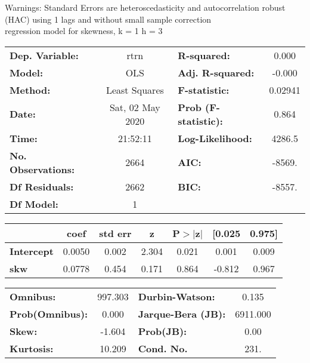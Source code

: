 Warnings: \newline
 [1] Standard Errors are heteroscedasticity and autocorrelation robust (HAC) using 1 lags and without small sample correction\\ 

regression model for skewness, k = 1 h = 3\begin{center}
\begin{tabular}{lclc}
\toprule
\textbf{Dep. Variable:}    &       rtrn       & \textbf{  R-squared:         } &     0.000   \\
\textbf{Model:}            &       OLS        & \textbf{  Adj. R-squared:    } &    -0.000   \\
\textbf{Method:}           &  Least Squares   & \textbf{  F-statistic:       } &   0.02941   \\
\textbf{Date:}             & Sat, 02 May 2020 & \textbf{  Prob (F-statistic):} &    0.864    \\
\textbf{Time:}             &     21:52:11     & \textbf{  Log-Likelihood:    } &    4286.5   \\
\textbf{No. Observations:} &        2664      & \textbf{  AIC:               } &    -8569.   \\
\textbf{Df Residuals:}     &        2662      & \textbf{  BIC:               } &    -8557.   \\
\textbf{Df Model:}         &           1      & \textbf{                     } &             \\
\bottomrule
\end{tabular}
\begin{tabular}{lcccccc}
                   & \textbf{coef} & \textbf{std err} & \textbf{z} & \textbf{P$> |$z$|$} & \textbf{[0.025} & \textbf{0.975]}  \\
\midrule
\textbf{Intercept} &       0.0050  &        0.002     &     2.304  &         0.021        &        0.001    &        0.009     \\
\textbf{skw}       &       0.0778  &        0.454     &     0.171  &         0.864        &       -0.812    &        0.967     \\
\bottomrule
\end{tabular}
\begin{tabular}{lclc}
\textbf{Omnibus:}       & 997.303 & \textbf{  Durbin-Watson:     } &    0.135  \\
\textbf{Prob(Omnibus):} &   0.000 & \textbf{  Jarque-Bera (JB):  } & 6911.000  \\
\textbf{Skew:}          &  -1.604 & \textbf{  Prob(JB):          } &     0.00  \\
\textbf{Kurtosis:}      &  10.209 & \textbf{  Cond. No.          } &     231.  \\
\bottomrule
\end{tabular}
\end{center}

